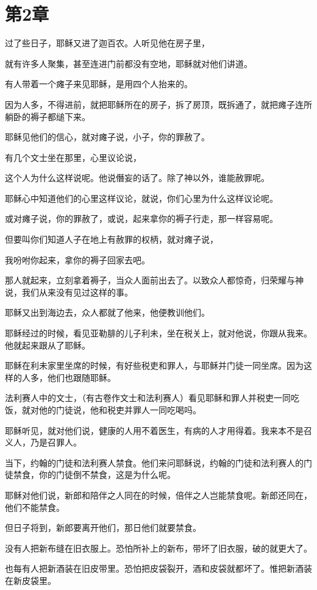 \documentclass[12pt,oneside]{book}
\begin{document}
\chapter{第2章}
过了些日子，耶稣又进了迦百农。人听见他在房子里，

就有许多人聚集，甚至连进门前都没有空地，耶稣就对他们讲道。

有人带着一个瘫子来见耶稣，是用四个人抬来的。

因为人多，不得进前，就把耶稣所在的房子，拆了房顶，既拆通了，就把瘫子连所躺卧的褥子都缒下来。

耶稣见他们的信心，就对瘫子说，小子，你的罪赦了。

有几个文士坐在那里，心里议论说，

这个人为什么这样说呢。他说僭妄的话了。除了神以外，谁能赦罪呢。

耶稣心中知道他们的心里这样议论，就说，你们心里为什么这样议论呢。

或对瘫子说，你的罪赦了，或说，起来拿你的褥子行走，那一样容易呢。

但要叫你们知道人子在地上有赦罪的权柄，就对瘫子说，

我吩咐你起来，拿你的褥子回家去吧。

那人就起来，立刻拿着褥子，当众人面前出去了。以致众人都惊奇，归荣耀与神说，我们从来没有见过这样的事。

耶稣又出到海边去，众人都就了他来，他便教训他们。

耶稣经过的时候，看见亚勒腓的儿子利未，坐在税关上，就对他说，你跟从我来。他就起来跟从了耶稣。

耶稣在利未家里坐席的时候，有好些税吏和罪人，与耶稣并门徒一同坐席。因为这样的人多，他们也跟随耶稣。

法利赛人中的文士，（有古卷作文士和法利赛人）看见耶稣和罪人并税吏一同吃饭，就对他的门徒说，他和税吏并罪人一同吃喝吗。

耶稣听见，就对他们说，健康的人用不着医生，有病的人才用得着。我来本不是召义人，乃是召罪人。

当下，约翰的门徒和法利赛人禁食。他们来问耶稣说，约翰的门徒和法利赛人的门徒禁食，你的门徒倒不禁食，这是为什么呢。

耶稣对他们说，新郎和陪伴之人同在的时候，倍伴之人岂能禁食呢。新郎还同在，他们不能禁食。

但日子将到，新郎要离开他们，那日他们就要禁食。

没有人把新布缝在旧衣服上。恐怕所补上的新布，带坏了旧衣服，破的就更大了。

也每有人把新酒装在旧皮带里。恐怕把皮袋裂开，酒和皮袋就都坏了。惟把新酒装在新皮袋里。
\end{document}

